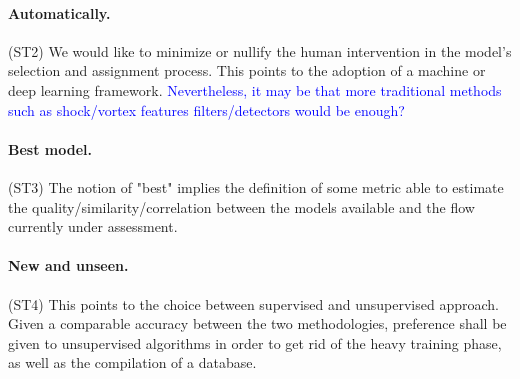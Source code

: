 \documentclass[crop=false]{standalone}
\begin{document}
\paragraph{Automatically.} (ST2) We would like to minimize or nullify the human intervention in the model's selection and assignment process. This points to the adoption of a machine or deep learning framework. \textcolor{blue}{Nevertheless, it may be that more traditional methods such as shock/vortex features filters/detectors would be enough?}

\paragraph{Best model.} (ST3) The notion of "best" implies the definition of some metric able to estimate the quality/similarity/correlation between the models available and the flow currently under assessment.

\paragraph{New and unseen.} (ST4) This points to the choice between supervised and unsupervised approach. Given a comparable accuracy between the two methodologies, preference shall be given to unsupervised algorithms in order to get rid of the heavy training phase, as well as the compilation of a database. 
\end{document}
